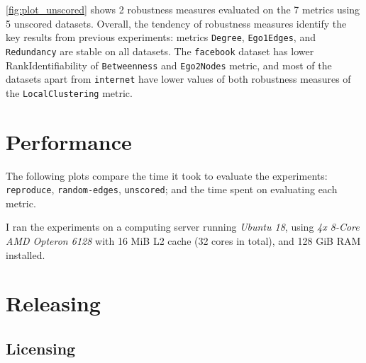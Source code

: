 

\autoref{fig:plot_unscored} shows 2 robustness measures evaluated on the 7 metrics using 5 unscored datasets.
Overall, the tendency of robustness measures identify the key results from previous experiments: metrics \texttt{Degree}, \texttt{Ego1Edges}, and \texttt{Redundancy} are stable on all datasets.
The \texttt{facebook} dataset has lower RankIdentifiability of \texttt{Betweenness} and \texttt{Ego2Nodes} metric, and most of the datasets apart from \texttt{internet} have lower values of both robustness measures of the \texttt{LocalClustering} metric.


\section{Performance}

The following plots compare the time it took to evaluate the experiments: \texttt{reproduce}, \texttt{random-edges}, \texttt{unscored}; and the time spent on evaluating each metric.

I ran the experiments on a computing server running \textsl{Ubuntu 18}, using \textsl{4x 8-Core AMD Opteron 6128} with 16 MiB L2 cache (32 cores in total), and 128 GiB RAM installed.




\section{Releasing \graffs}

\subsection{Licensing}
